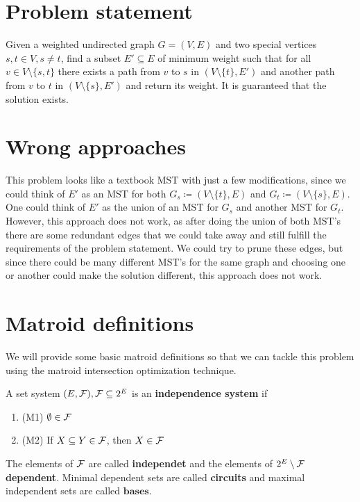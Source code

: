 \documentclass[english,12pt]{article}
\begin{document}
    \section{Problem statement}
        Given a weighted undirected graph $G = (V, E)$ and two special vertices $s, t \in V, s \neq t$, find a subset $E' \subseteq E$ of minimum weight such that for all $v \in V \setminus \{s, t\}$ there exists a path from $v$ to $s$ in $(V \setminus \{t\}, E')$ and another path from $v$ to $t$ in $(V \setminus \{s\}, E')$ and return its weight.
        It is guaranteed that the solution exists.

    \section{Wrong approaches}
        This problem looks like a textbook MST with just a few modifications, since we could think of $E'$ as an MST for both $G_s \coloneqq (V \setminus \{t\}, E)$ and $G_t \coloneqq (V \setminus \{s\}, E)$.
        One could think of $E'$ as the union of an MST for $G_s$ and another MST for $G_t$.
        However, this approach does not work, as after doing the union of both MST's there are some redundant edges that we could take away and still fulfill the requirements of the problem statement.
        We could try to prune these edges, but since there could be many different MST's for the same graph and choosing one or another could make the solution different, this approach does not work.

    \section{Matroid definitions}
        We will provide some basic matroid definitions so that we can tackle this problem using the matroid intersection optimization technique.
        \begin{definition}
            A set system $(E, \mathcal{F}), \mathcal{F} \subseteq 2^E$ is an \textbf{independence system} if
            \begin{enumerate}
                \item (M1) $\emptyset \in \mathcal{F}$
                \item (M2) If $X \subseteq Y \in \mathcal{F}$, then $X \in \mathcal{F}$
            \end{enumerate}
            The elements of $\mathcal{F}$ are called \textbf{independet} and the elements of $2^E \setminus \mathcal{F}$ \textbf{dependent}.
            Minimal dependent sets are called \textbf{circuits} and maximal independent sets are called $\textbf{bases}$.
        \end{definition}
\end{document}
